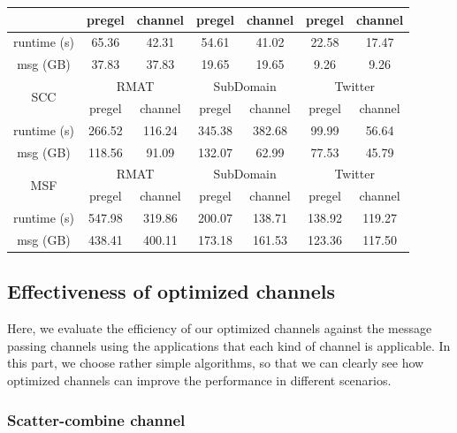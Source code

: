 \documentclass{sokendai_thesis} %
\newcommand{\PP}{Pregel+}
\begin{document}
\begin{table}[t]
{\begin{tabular}{c|c|c|c|c|c|c}
\cline{2-7}
 & pregel & channel & pregel & channel & pregel & channel \\
\hline
runtime (s) & 65.36 & 42.31 & 54.61 & 41.02 & 22.58 & 17.47 \\
\hline
msg (GB) & 37.83 & 37.83 & 19.65 & 19.65 & 9.26 & 9.26 \\
\hline
\hline
\multirow{2}{*}{SCC} & \multicolumn{2}{|c}{RMAT} & \multicolumn{2}{|c}{SubDomain} & \multicolumn{2}{|c}{Twitter} \\
\cline{2-7}
 & pregel & channel & pregel & channel & pregel & channel \\
\hline
runtime (s) & 266.52 & 116.24 & 345.38 & 382.68 & 99.99 & 56.64 \\
\hline
msg (GB) & 118.56 & 91.09 & 132.07 & 62.99 & 77.53 & 45.79 \\
\hline
\hline
\multirow{2}{*}{MSF} & \multicolumn{2}{|c}{RMAT} & \multicolumn{2}{|c}{SubDomain} & \multicolumn{2}{|c}{Twitter} \\
\cline{2-7}
 & pregel & channel & pregel & channel & pregel & channel \\
\hline
runtime (s) & 547.98 & 319.86 & 200.07 & 138.71 & 138.92 & 119.27 \\
\hline
msg (GB) & 438.41 & 400.11 & 173.18 & 161.53 & 123.36 & 117.50 \\
\hline
\end{tabular}}
\end{table}

\subsection{Effectiveness of optimized channels}

Here, we evaluate the efficiency of our optimized channels against the message passing channels using the applications that each kind of channel is applicable.
In this part, we choose rather simple algorithms, so that we can clearly see how optimized channels can improve the performance in different scenarios.

\subsubsection{Scatter-combine channel}
\label{sec:eval-sc}


\end{document}
